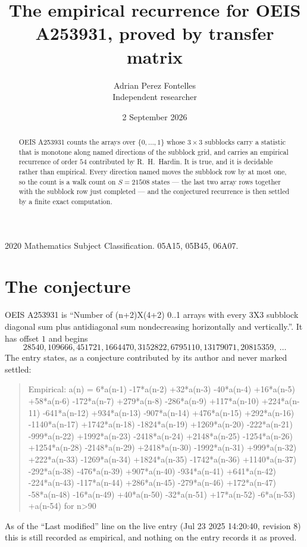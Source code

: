 \documentclass[11pt,a4paper]{article}
\title{The empirical recurrence for OEIS A253931, proved by transfer matrix}
\author{Adrian Perez Fontelles\\ \small Independent researcher}
\date{2 September 2026}
\theoremstyle{plain}
\theoremstyle{definition}
\begin{document}
\maketitle

\begin{abstract}
OEIS A253931 counts the arrays over $\{0,\dots,1\}$ whose $3\times3$ subblocks carry a
statistic that is monotone along named directions of the subblock grid, and carries an
empirical recurrence of order $54$ contributed by R.~H.~Hardin. It is true, and it is
decidable rather than empirical. Every direction named moves the subblock row by at most one,
so the count is a walk count on $S=21508$ states --- the last two array rows together with the
subblock row just completed --- and the conjectured recurrence is then settled by a finite
exact computation.
\end{abstract}

\noindent\small 2020 Mathematics Subject Classification. 05A15, 05B45, 06A07.\normalsize

\section{The conjecture}

OEIS A253931 is ``Number of (n+2)X(4+2) 0..1 arrays with every 3X3 subblock diagonal sum plus antidiagonal sum nondecreasing horizontally and vertically.''. It has offset $1$ and begins
\[
28540, 109666, 451721, 1664470, 3152822, 6795110, 13179071, 20815359,\ \dots
\]
The entry states, as a conjecture contributed by its author and never marked settled:
\begin{quote}
Empirical: a(n) = 6*a(n-1) -17*a(n-2) +32*a(n-3) -40*a(n-4) +16*a(n-5) +58*a(n-6) -172*a(n-7) +279*a(n-8) -286*a(n-9) +117*a(n-10) +224*a(n-11) -641*a(n-12) +934*a(n-13) -907*a(n-14) +476*a(n-15) +292*a(n-16) -1140*a(n-17) +1742*a(n-18) -1824*a(n-19) +1269*a(n-20) -222*a(n-21) -999*a(n-22) +1992*a(n-23) -2418*a(n-24) +2148*a(n-25) -1254*a(n-26) +1254*a(n-28) -2148*a(n-29) +2418*a(n-30) -1992*a(n-31) +999*a(n-32) +222*a(n-33) -1269*a(n-34) +1824*a(n-35) -1742*a(n-36) +1140*a(n-37) -292*a(n-38) -476*a(n-39) +907*a(n-40) -934*a(n-41) +641*a(n-42) -224*a(n-43) -117*a(n-44) +286*a(n-45) -279*a(n-46) +172*a(n-47) -58*a(n-48) -16*a(n-49) +40*a(n-50) -32*a(n-51) +17*a(n-52) -6*a(n-53) +a(n-54) for n>90
\end{quote}
As of the ``Last modified'' line on the live entry (Jul 23 2025 14:20:40, revision 8) this is still
recorded as empirical, and nothing on the entry records it as proved.
\end{document}
